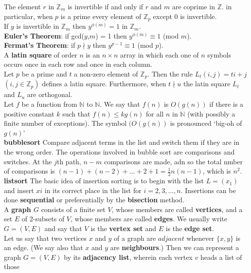 \documentclass[10pt,landscape]{article}
\begin{document}
\begin{multicols}{3}
The element $r$ in $\mathbb{Z}_{m}$ is invertible if and only if $r$
and $m$ are coprime in $\mathbb{Z}$. in particular, when $p$ is a
prime every element of $\mathbb{Z}_{p}$ except 0 is invertible.\\
If $y$ is invertible in $\mathbb{Z}_{m}$ then $y^{\phi (m)} = 1$ in
$\mathbb{Z}_{m}$.\\
\textbf{Euler's Theorem}: if gcd($y$,$m$) = 1 then $y^{\phi (m)}
\equiv 1$ (mod $m$).\\
\textbf{Fermat's Theorem}: if $p \nmid y$ then $y^{p-1} \equiv 1$ (mod
$p$).\\
A \textbf{latin square} of order $n$ is an $n \times n$ array in which
each one of $n$ symbols occurs once in each row and once in each
column.\\
Let $p$ be a prime and $t$ a non-zero element of
$\mathbb{Z}_{p}$. Then the rule $L_{t}(i,j) =ti+j$ $(i,j \in
\mathbb{Z}_{p})$ defines a latin square. Furthermore, when $t \nmid u$
the latin square $L_{t}$ and $L_{u}$ are orthogonal.\\
Let $f$ be a function from $\mathbb{N}$ to $\mathbb{N}$. We say that
$f(n)$ is $O(g(n))$ if there is a positive constant $k$ such that
$f(n) \leq kg(n)$ for all $n$ in $\mathbb{N}$ (with possibly a finite
number of exceptions). The symbol $(O(g(n))$ is pronounced `big-oh of
$g(n)$'\\
\textbf{bubblesort} Compare adjacent terms in the list and switch them
if they are in the wrong order. The operations involved in bubble sort
are comparisons and switches. At the $j$th path, $n-m$ comparisons are
made, adn so the total nmber of comparisons is $(n-1)+(n-2)+ \dots + 2
+ 1 = \frac{1}{2}n(n-1)$, which is $n^{2}$.
\textbf{listsort} The basic idea of insertion sorting is to begin with
the list $L = (x_{1})$ and insert $x{i}$ in its correct place in the
list for $i = 2,3,\dots ,n$. Insertions can be done
\textbf{sequential} or preferentially by the \textbf{bisection}
method.\\
A \textbf{graph $G$} consists of a finite set $V$, whose members are
called \textbf{vertices}, and a set $E$ of 2-subsets of $V$, whose
members are called \textbf{edges}. We usually write $G = (V,E)$ and
say that $V$ is the \textbf{vertex set} and $E$ is the \textbf{edge
  set}.\\
Let us say that two vertices $x$ and $y$ of a graph are $adjacent$
whenever $\{x,y\}$ is an edge. (We say also that $x$ and $y$ are
\textbf{neighbours}.) Then we can represent a graph $G = (V,E)$ by its
\textbf{adjacency list}, wherein each vertex $v$ heads a list of those

\end{multicols}
\end{document}
